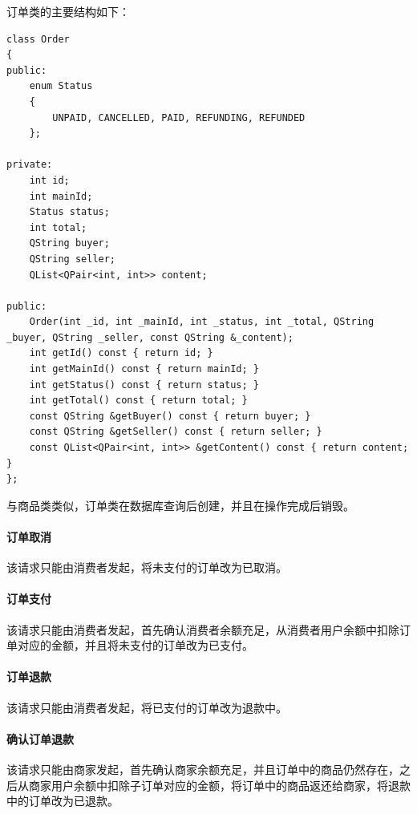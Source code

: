 \documentclass[lang=cn,11pt,a4paper,cite=authornum]{paper}
\begin{document}
订单类的主要结构如下：

\begin{code}
\begin{verbatim}
class Order
{
public:
    enum Status
    {
        UNPAID, CANCELLED, PAID, REFUNDING, REFUNDED
    };
 
private:
    int id;
    int mainId;
    Status status;
    int total; 
    QString buyer;
    QString seller;
    QList<QPair<int, int>> content; 
 
public:
    Order(int _id, int _mainId, int _status, int _total, QString _buyer, QString _seller, const QString &_content);
    int getId() const { return id; }
    int getMainId() const { return mainId; }
    int getStatus() const { return status; }
    int getTotal() const { return total; }
    const QString &getBuyer() const { return buyer; }
    const QString &getSeller() const { return seller; }
    const QList<QPair<int, int>> &getContent() const { return content; }
};
\end{verbatim}
\end{code}

与商品类类似，订单类在数据库查询后创建，并且在操作完成后销毁。

\paragraph{订单取消}

该请求只能由消费者发起，将未支付的订单改为已取消。

\paragraph{订单支付}

该请求只能由消费者发起，首先确认消费者余额充足，从消费者用户余额中扣除订单对应的金额，并且将未支付的订单改为已支付。

\paragraph{订单退款}

该请求只能由消费者发起，将已支付的订单改为退款中。

\paragraph{确认订单退款}

该请求只能由商家发起，首先确认商家余额充足，并且订单中的商品仍然存在，之后从商家用户余额中扣除子订单对应的金额，将订单中的商品返还给商家，将退款中的订单改为已退款。
\end{document}
